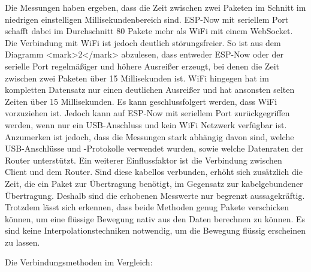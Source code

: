 Die Messungen haben ergeben, dass die Zeit zwischen zwei Paketen im Schnitt im niedrigen einstelligen Millisekundenbereich sind.
ESP-Now mit seriellem Port schafft dabei im Durchschnitt 80 Pakete mehr als WiFi mit einem WebSocket.
Die Verbindung mit WiFi ist jedoch deutlich störungsfreier.
So ist aus dem Diagramm <mark>2</mark> abzulesen, dass entweder ESP-Now oder der serielle Port regelmäßiger und höhere Ausreißer erzeugt, bei denen die Zeit zwischen zwei Paketen über 15 Millisekunden ist.
WiFi hingegen hat im kompletten Datensatz nur einen deutlichen Ausreißer und hat ansonsten selten Zeiten über 15 Millisekunden. Es kann geschlussfolgert werden, dass WiFi vorzuziehen ist.
Jedoch kann auf ESP-Now mit seriellem Port zurückgegriffen werden, wenn nur ein USB-Anschluss und kein WiFi Netzwerk verfügbar ist.
Anzumerken ist jedoch, dass die Messungen stark abhängig davon sind, welche USB-Anschlüsse und -Protokolle verwendet wurden, sowie welche Datenraten der Router unterstützt.
Ein weiterer Einflussfaktor ist die Verbindung zwischen Client und dem Router.
Sind diese kabellos verbunden, erhöht sich zusätzlich die Zeit, die ein Paket zur Übertragung benötigt, im Gegensatz zur kabelgebundener Übertragung.
Deshalb sind die erhobenen Messwerte nur begrenzt aussagekräftig.
Trotzdem lässt sich erkennen, dass beide Methoden genug Pakete verschicken können, um eine flüssige Bewegung nativ aus den Daten berechnen zu können.
Es sind keine Interpolationstechniken notwendig, um die Bewegung flüssig erscheinen zu lassen.

Die Verbindungsmethoden im Vergleich:


